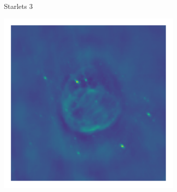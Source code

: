 \begin{figure}[h]
\begin{subfigure}[b]{0.3\linewidth}
	\end{subfigure}
	\begin{subfigure}[b]{0.3\linewidth}
		\begin{center}Starlets 3\end{center}
		\includegraphics[width=\linewidth, trim={18px 19px 18px 18px}, clip]{./chapters/05.results/g55/starlets3_image.png}
	\end{subfigure}
	

\end{figure}
